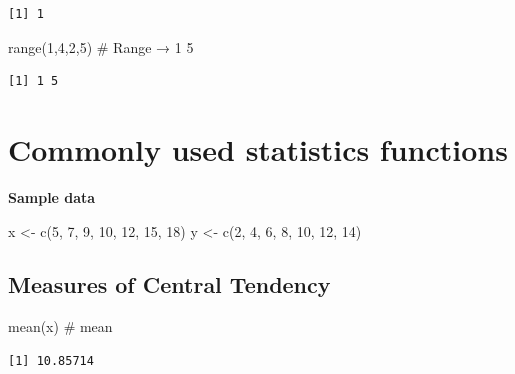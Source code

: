 \documentclass[
  letterpaper,
  DIV=11,
  numbers=noendperiod]{scrreprt}
\newenvironment{Shaded}{\begin{snugshade}}{\end{snugshade}}
\newcommand{\CommentTok}[1]{\textcolor[rgb]{0.37,0.37,0.37}{#1}}
\newcommand{\DecValTok}[1]{\textcolor[rgb]{0.68,0.00,0.00}{#1}}
\newcommand{\FunctionTok}[1]{\textcolor[rgb]{0.28,0.35,0.67}{#1}}
\newcommand{\NormalTok}[1]{\textcolor[rgb]{0.00,0.23,0.31}{#1}}
\newcommand{\OtherTok}[1]{\textcolor[rgb]{0.00,0.23,0.31}{#1}}
\begin{document}
\begin{verbatim}
[1] 1
\end{verbatim}

\begin{Shaded}
\begin{Highlighting}[]
\FunctionTok{range}\NormalTok{(}\DecValTok{1}\NormalTok{,}\DecValTok{4}\NormalTok{,}\DecValTok{2}\NormalTok{,}\DecValTok{5}\NormalTok{)         }\CommentTok{\# Range → 1 5}
\end{Highlighting}
\end{Shaded}

\begin{verbatim}
[1] 1 5
\end{verbatim}

\section{Commonly used statistics
functions}\label{commonly-used-statistics-functions}

\textbf{Sample data}

\begin{Shaded}
\begin{Highlighting}[]
\NormalTok{x }\OtherTok{\textless{}{-}} \FunctionTok{c}\NormalTok{(}\DecValTok{5}\NormalTok{, }\DecValTok{7}\NormalTok{, }\DecValTok{9}\NormalTok{, }\DecValTok{10}\NormalTok{, }\DecValTok{12}\NormalTok{, }\DecValTok{15}\NormalTok{, }\DecValTok{18}\NormalTok{)}
\NormalTok{y }\OtherTok{\textless{}{-}} \FunctionTok{c}\NormalTok{(}\DecValTok{2}\NormalTok{, }\DecValTok{4}\NormalTok{, }\DecValTok{6}\NormalTok{, }\DecValTok{8}\NormalTok{, }\DecValTok{10}\NormalTok{, }\DecValTok{12}\NormalTok{, }\DecValTok{14}\NormalTok{)}
\end{Highlighting}
\end{Shaded}

\subsection{Measures of Central
Tendency}\label{measures-of-central-tendency}

\begin{Shaded}
\begin{Highlighting}[]
\FunctionTok{mean}\NormalTok{(x) }\CommentTok{\# mean}
\end{Highlighting}
\end{Shaded}

\begin{verbatim}
[1] 10.85714
\end{verbatim}
\end{document}
